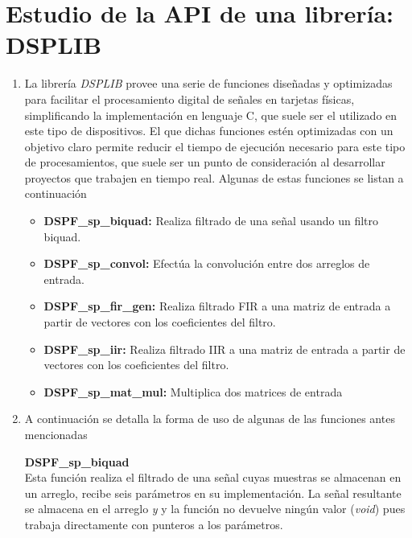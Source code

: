 \section{Estudio de la API de una librería: DSPLIB}

\begin{enumerate}
    \item  La librería \textit{DSPLIB} provee una serie de funciones diseñadas y optimizadas para facilitar el procesamiento digital de señales en tarjetas físicas, simplificando la implementación en lenguaje C, que suele ser el utilizado en este tipo de dispositivos. El que dichas funciones estén optimizadas con un objetivo claro permite reducir el tiempo de ejecución necesario para este tipo de procesamientos, que suele ser un punto de consideración al desarrollar proyectos que trabajen en tiempo real. Algunas de estas funciones se listan a continuación



\begin{itemize}
    
    \item \textbf{DSPF\_sp\_biquad:} Realiza  filtrado de una señal usando un filtro biquad.
    \item \textbf{DSPF\_sp\_convol:} Efectúa la convolución entre dos arreglos de entrada.
    \item \textbf{DSPF\_sp\_fir\_gen:} Realiza  filtrado FIR a una matriz de entrada  a partir de vectores con los coeficientes del filtro.
    \item \textbf{DSPF\_sp\_iir:}  Realiza  filtrado IIR a una matriz de entrada  a partir de vectores con los coeficientes del filtro.
    \item \textbf{DSPF\_sp\_mat\_mul:} Multiplica dos matrices de entrada 
    
\end{itemize}


\item A continuación se detalla la forma de uso de algunas de las funciones antes mencionadas



 \textbf{DSPF\_sp\_biquad} \\
    Esta función realiza el filtrado de una señal cuyas muestras se  almacenan en un arreglo, recibe seis parámetros en su implementación. La señal resultante se almacena en el arreglo \textit{y} y la función no devuelve ningún valor (\textit{void}) pues trabaja directamente con punteros a los parámetros.
    

\end{enumerate}
